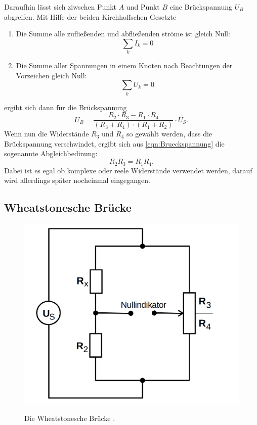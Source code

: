 Daraufhin lässt sich ziwschen Punkt $A$ und Punkt $B$ eine Brückspannung $U_B$ abgreifen.
Mit Hilfe der beiden Kirchhoffschen Gesetzte
\begin{enumerate}
\item Die Summe alle zufließenden und abfließenden ströme ist gleich Null:
\begin{equation}
\sum_k I_k = 0
\end{equation}
\item Die Summe aller Spannungen in einem Knoten nach Beachtungen der Vorzeichen gleich Null:
\begin{equation}
\sum_k U_k = 0
\end{equation}
\end{enumerate}
ergibt sich dann für die Brückspannung 
\begin{equation}
U_B = \frac{R_2\cdot R_3 - R_1 \cdot R_4}{(R_3 + R_4) \cdot (R_1 + R_2)} \cdot U_S .
\label{eqn:Brueckspannung}
\end{equation}
Wenn nun die Widerstände $R_3$ und $R_4$ so gewählt werden, dass die Brückspannung verschwindet,
ergibt sich aus \eqref{eqn:Brueckspannung} die sogenannte Abgleichbedinung:
\begin{equation}
R_2 R_3 = R_1 R_4 .
\label{eqn:abgleich}
\end{equation}
Dabei ist es egal ob komplexe oder reele Widerstände verwendet werden, darauf wird allerdings später nocheinmal eingegangen.

\subsection{Wheatstonesche Brücke}

\begin{figure}
    \centering
    \includegraphics[scale=0.25]{content/Wheatstonesche.png}
    \label{fig:wheatstonesche}
    \caption{Die Wheatstonesche Brücke \cite[S. 219]{anleitung}.}
\end{figure}

